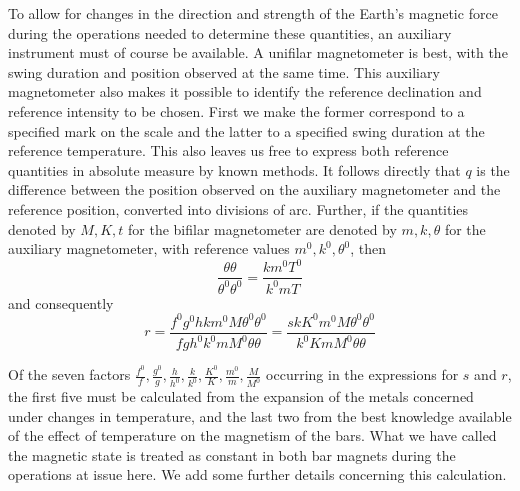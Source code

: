 To allow for changes in the direction and strength of the Earth’s magnetic force during the operations needed to determine these quantities, an auxiliary instrument must of course be available. A unifilar magnetometer is best, with the swing duration and position observed at the same time. This auxiliary magnetometer also makes it possible to identify the reference declination and reference intensity to be chosen. First we make the former correspond to a specified mark on the scale and the latter to a specified swing duration at the reference temperature. This also leaves us free to express both reference quantities in absolute measure by known methods. It follows directly that $q$ is the difference between the position observed on the auxiliary magnetometer and the reference position, converted into divisions of arc. Further, if the quantities denoted by $M,K,t$ for the bifilar magnetometer are denoted by $m,k,\theta$ for the auxiliary magnetometer, with reference values $m^0,k^0,\theta^0$, then
\[
\frac{\theta\theta}{\theta^0\theta^0}=\frac{km^0T^0}{k^0mT}
\]
and consequently
\[
r=\frac{f^0g^0hkm^0M\theta^0\theta^0}{fgh^0k^0mM^0\theta\theta}=\frac{skK^0m^0M\theta^0\theta^0}{k^0KmM^0\theta\theta}
\]

Of the seven factors $\frac{f^0}{f},\frac{g^0}{g},\frac{h}{h^0},\frac{k}{k^0},\frac{K^0}{K},\frac{m^0}{m},\frac{M}{M^0}$ occurring in the expressions for $s$ and $r$, the first five must be calculated from the expansion of the metals concerned under changes in temperature, and the last two from the best knowledge available of the effect of temperature on the magnetism of the bars. What we have called the magnetic state is treated as constant in both bar magnets during the operations at issue here. We add some further details concerning this calculation.


